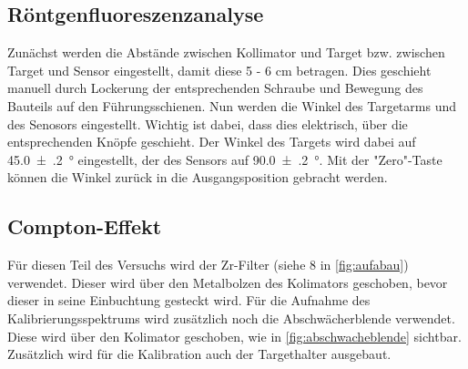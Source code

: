 \documentclass[12pt,english,ngerman]{scrartcl}
\begin{document}
\subsection{Röntgenfluoreszenzanalyse}

Zunächst werden die Abstände zwischen Kollimator und Target bzw. zwischen Target und Sensor eingestellt, damit diese 
5 - 6 cm betragen. Dies geschieht manuell durch Lockerung der entsprechenden Schraube und Bewegung des Bauteils auf den
Führungsschienen.
Nun werden die Winkel des Targetarms und 
des Senosors eingestellt. Wichtig ist dabei, dass dies elektrisch, über die entsprechenden Knöpfe geschieht.
Der Winkel des Targets wird dabei auf \SI{45.0(2)}{\degree} eingestellt, der des Sensors auf \SI{90.0(2)}{\degree}.
Mit der "Zero"-Taste können die Winkel zurück in die Ausgangsposition gebracht werden.

\subsection{Compton-Effekt}

Für diesen Teil des Versuchs wird der Zr-Filter (siehe 8 in \autoref{fig:aufabau}) verwendet.
Dieser wird über den Metalbolzen des Kolimators geschoben, bevor dieser in seine Einbuchtung gesteckt wird.
Für die Aufnahme des Kalibrierungsspektrums wird zusätzlich noch die Abschwächerblende verwendet. Diese wird 
über den Kolimator geschoben, wie in \autoref{fig:abschwacheblende} sichtbar. Zusätzlich wird für
die Kalibration auch der Targethalter ausgebaut.


\begin{figure}[H]
	\centering
	 \hfill
\end{figure}
\end{document}
